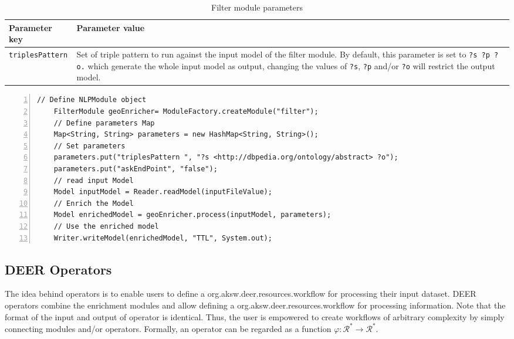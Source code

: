 \documentclass[a4paper,twoside,bibtotoc,abstracton,12pt,BCOR=15mm]{article}
\newcommand{\geolift}{\textsc{DEER}\xspace}
\begin{document}
    \begin{table}
    \caption{Filter module parameters} \label{tbl:filterPram}
    \small
    \begin{tabularx}{\textwidth}{@{}lX@{}}
    \toprule
    \textbf{Parameter key} 	& \textbf{Parameter value} \\
    \toprule
    \texttt{triplesPattern}	& Set of triple pattern to run against the input model of the filter module. By default, this parameter is set to \texttt{?s ?p ?o.} which generate the whole input model as output, changing the values of \texttt{?s}, \texttt{?p} and/or \texttt{?o} will restrict the output model.\\
    \bottomrule
    \end{tabularx}
    \end{table}
    
    \begin{lstlisting}[label=lst:filterModule, float=tp, numbers=left, numberstyle=\tiny, caption = Code fragment to call the \texttt{FilterModule} class.]
    // Define NLPModule object
    FilterModule geoEnricher= ModuleFactory.createModule("filter");
    // Define parameters Map
    Map<String, String> parameters = new HashMap<String, String>();
    // Set parameters
    parameters.put("triplesPattern ", "?s <http://dbpedia.org/ontology/abstract> ?o");
    parameters.put("askEndPoint", "false");
    // read input Model
    Model inputModel = Reader.readModel(inputFileValue);
    // Enrich the Model
    Model enrichedModel = geoEnricher.process(inputModel, parameters);
    // Use the enriched model
    Writer.writeModel(enrichedModel, "TTL", System.out);
    \end{lstlisting}
    
\subsection{\geolift Operators}
The idea behind operators is to enable users to define a org.aksw.deer.resources.workflow for processing their input dataset.
\geolift operators combine the enrichment modules and allow defining a org.aksw.deer.resources.workflow for processing information.
Note that the format of the input and output of operator is identical. 
Thus, the user is empowered to create workflows of arbitrary complexity by simply connecting modules and/or operators.
Formally, an operator can be regarded as a function $\varphi: \mathcal{R}^* \rightarrow \mathcal{R}^*$.
\end{document}
